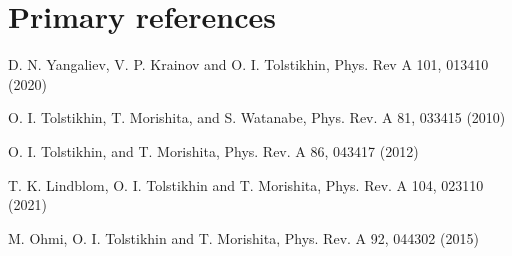 \documentclass[11pt]{article}
\begin{document}
\section*{Primary references}

              \noindent	[1] D. N. Yangaliev, V. P. Krainov and O. I. Tolstikhin, 
 		Phys. Rev A 101, 013410 (2020) 

              \noindent [2] O. I. Tolstikhin, T. Morishita, and S. Watanabe, 
	       Phys. Rev. A 81, 033415 (2010) 

	      \noindent [3] O. I. Tolstikhin, and T. Morishita,
               Phys. Rev. A 86, 043417 (2012)

              \noindent	[4] T. K. Lindblom, O. I. Tolstikhin and T. Morishita, 
 		Phys. Rev. A 104, 023110 (2021)

              \noindent [5] M. Ohmi, O. I. Tolstikhin and T. Morishita, 
 		Phys. Rev. A 92, 044302 (2015) \\
\end{document}
